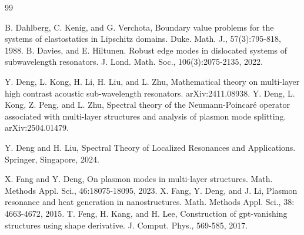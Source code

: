 \documentclass[10pt,reqno,oneside]{amsart}%
\theoremstyle{definition}
\theoremstyle{remark}
\numberwithin{equation}{section}
\numberwithin{equation}{section}
\begin{document}
\begin{thebibliography}{99}

B. Dahlberg, C. Kenig, and G. Verchota, Boundary value problems for the systems of elastostatics in Lipschitz domains. Duke. Math. J., 57(3):795-818, 1988.
B. Davies, and E. Hiltunen. Robust edge modes in dislocated systems of subwavelength resonators. J. Lond. Math. Soc., 106(3):2075-2135, 2022.

Y. Deng, L. Kong, H. Li, H. Liu, and L. Zhu, Mathematical theory on multi-layer high contrast acoustic sub-wavelength resonators. arXiv:2411.08938.
Y. Deng, L. Kong, Z. Peng, and L. Zhu, Spectral theory of the Neumann-Poincar\'{e} operator associated with
multi-layer structures and analysis of plasmon mode splitting. arXiv:2504.01479.



Y. Deng and H. Liu, Spectral Theory of Localized Resonances and Applications. Springer, Singapore, 2024.

X. Fang and Y. Deng, On plasmon modes in multi-layer structures. Math. Methods Appl. Sci., 46:18075-18095, 2023.
X. Fang, Y. Deng, and J. Li, Plasmon resonance and heat generation in nanostructures. Math. Methods Appl. Sci., 38: 4663-4672, 2015.
T. Feng, H. Kang, and H. Lee, Construction of gpt-vanishing structures using shape derivative. J. Comput. Phys., 569-585, 2017.






\end{thebibliography}
\end{document}
